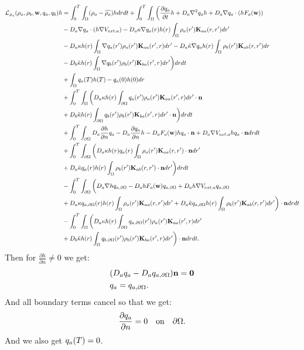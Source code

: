 	\begin{align*}
	\mathcal{L}_{\rho_a}(\rho_a,\rho_b, \mathbf{w}, q_a, q_b) h &= \int_0^T \int_\Omega ( \rho_a - \widehat{\rho_a})h dr dt 
	+ \int_0^T \int_\Omega \bigg(\frac{\partial q_a}{\partial t}h + D_a\nabla^2 q_a h + D_a\nabla q_a \cdot(h F_a(\mathbf{w})) \\
	&  - D_a \nabla q_a \cdot (h \nabla V_{ext,a})  - D_a\kappa \nabla q_a(r) h(r)  \int_\Omega \rho_a (r') \mathbf{K}_{aa}(r,r')dr' \\
	&- D_a\kappa h (r)\int_\Omega \nabla q_a(r') \rho_a (r') \mathbf{K}_{aa}(r',r)dr' - D_a \tilde{\kappa} \nabla q_a h(r) \int_\Omega  \rho_b (r') \mathbf{K}_{ab} (r,r')dr \\
	&- D_b \tilde \kappa h (r)\int_\Omega \nabla q_b(r') \rho_b (r') \mathbf{K}_{ba}(r',r)dr'\bigg)  dr dt \\
	 &+\int_{ \Omega} q_a(T)h(T) - q_a(0)h(0) dr \\
	 &+ \int_0^T \int_{\Omega} \bigg(D_a \kappa h(r) \int_{\partial \Omega} q_a(r') \rho_a(r') \mathbf{K}_{aa}(r',r)  dr' \cdot \mathbf{n} \\
	 &+ D_b \tilde \kappa h(r) \int_{\partial \Omega} q_b(r') \rho_b(r') \mathbf{K}_{ba}(r',r)dr' \cdot \mathbf{n} \bigg) dr dt\\
	 &+ \int_0^T \int_{\partial \Omega} D_a \frac{\partial h}{\partial n}q_a - D_a \frac{\partial q_a}{\partial n}h - D_a F_a(\mathbf{w}) h q_a \cdot \mathbf{n} + D_a \nabla V_{ext,a} h q_a \cdot \mathbf{n} dr dt\\ 
	 & + \int_0^T \int_{\partial \Omega} \bigg(D_a \kappa h(r) q_a(r) \int_\Omega \rho_a(r') \mathbf{K}_{aa}(r,r') \cdot \mathbf{n} dr' \\
	 &+ D_a \tilde{\kappa} q_a(r) h(r) \int_\Omega \rho_b(r') \mathbf{K}_{ab}(r,r') \cdot \mathbf{n} dr' \bigg) dr dt\\
	 &- \int_0^T \int_{\partial \Omega} \bigg( D_a \nabla h q_{a,\partial \Omega}- D_a h F_a(\mathbf{w})q_{a,\partial \Omega} + D_a h \nabla V_{ext,a}q_{a,\partial \Omega}\\
	 & + D_a\kappa q_{a,\partial \Omega}(r) h(r)  \int_\Omega \rho_a (r') \mathbf{K}_{aa}(r,r')dr' +  D_a\tilde{\kappa}q_{a,\partial \Omega}  h(r)\int_\Omega \rho_b (r') \mathbf{K}_{ab}(r,r')dr' \bigg) \cdot \mathbf{n} dr dt \\
	 &- \int_0^T \int_{\Omega} \bigg(D_a\kappa h(r) \int_{\partial \Omega} q_{a,\partial \Omega}(r') \rho_a(r')   \mathbf{K}_{aa}(r',r)dr'\\
	 & +D_b\tilde{\kappa} h(r)  \int_\Omega q_{b,\partial \Omega}(r') \rho_b(r') \mathbf{K}_{ba}(r',r)dr'  \bigg) \cdot \mathbf{n}  dr dt.\\
	\end{align*}
	Then for $\frac{\partial h}{\partial n} \neq 0$ we get:
	\begin{align*}
	&(D_a q_a - D_a q_{a,\partial \Omega}) \mathbf{n} = \mathbf 0\\
	&q_a = q_{a,\partial \Omega}.
	\end{align*}
	And all boundary terms cancel so that we get:
	\begin{align*}
	\frac{\partial q_a}{\partial n} = 0 \quad \text{on} \quad \partial \Omega.
	\end{align*}
	And we also get $q_a(T) = 0$.
	
